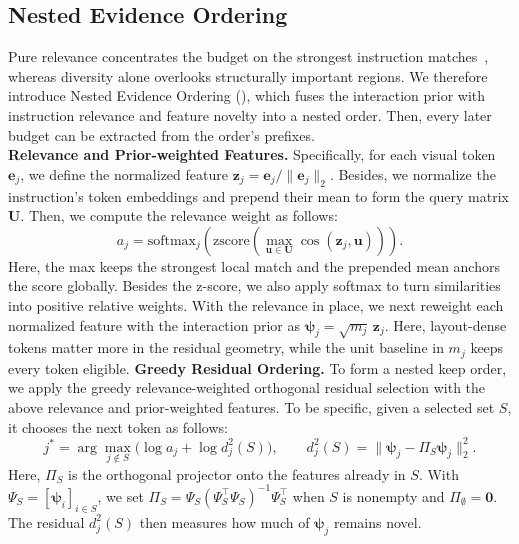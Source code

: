 \subsection{Nested Evidence Ordering}
\label{sec:method-b}
%
Pure relevance concentrates the budget on the strongest instruction matches~\citep{zhang2025cdpruner}, whereas diversity alone overlooks structurally important regions.
%
We therefore introduce Nested Evidence Ordering (\nwe{}), which fuses the interaction prior with instruction relevance and feature novelty into a nested order.
%
Then, every later budget can be extracted from the order's prefixes.
\\
\noindent\textbf{Relevance and Prior-weighted Features.}
Specifically, for each visual token $\mathbf e_j$, we define the normalized feature $\mathbf z_j=\mathbf e_j/\lVert\mathbf e_j\rVert_2$.
%
Besides, we normalize the instruction's token embeddings and prepend their mean to form the query matrix $\mathbf U$.
%
Then, we compute the relevance weight as follows:
\begin{equation}
    a_j =
    \mathrm{softmax}_j\!\left(
    \mathrm{zscore}\!\left(
    \max_{\mathbf u\in\mathbf U}\cos(\mathbf z_j,\mathbf u)
    \right)\right).
    \label{eq:likelihood}
\end{equation}
Here, the max keeps the strongest local match and the prepended mean anchors the score globally.
%
Besides the z-score, we also apply softmax to turn similarities into positive relative weights.
%
With the relevance in place, we next reweight each normalized feature with the interaction prior as $\boldsymbol\psi_j=\sqrt{m_j}\,\mathbf z_j$.
%
Here, layout-dense tokens matter more in the residual geometry, while the unit baseline in $m_j$ keeps every token eligible.
%
\noindent\textbf{Greedy Residual Ordering.}
To form a nested keep order, we apply the greedy relevance-weighted orthogonal residual selection with the above relevance and prior-weighted features.
%
To be specific, given a selected set $S$, it chooses the next token as follows:
\begin{equation}
j^\ast=\arg\max_{j\notin S}\bigl(\log a_j+\log d_j^2(S)\bigr),\qquad
d_j^2(S)=\lVert\boldsymbol\psi_j-\Pi_S\boldsymbol\psi_j\rVert_2^2 .
\label{eq:qd}
\end{equation}
Here, $\Pi_S$ is the orthogonal projector onto the features already in $S$.
%
With $\Psi_S=[\boldsymbol\psi_i]_{i\in S}$, we set $\Pi_S=\Psi_S(\Psi_S^{\top}\Psi_S)^{-1}\Psi_S^{\top}$ when $S$ is nonempty and $\Pi_\emptyset=\mathbf 0$.
%
The residual $d_j^2(S)$ then measures how much of $\boldsymbol\psi_j$ remains novel.
